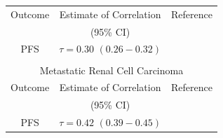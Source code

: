 \begin{table}[hb]
\begin{tabular}{|c|c|c|}
\hline
Outcome     & Estimate of Correlation    & Reference \\ 
            &  (95\% CI)    &           \\
\hline
PFS  & $\tau = 0.30$ $(0.26 - 0.32)$  & \cite{Halabi2009}   \\    
\hline
\multicolumn{3}{c}{ } \\
\multicolumn{3}{c}{Metastatic Renal Cell Carcinoma}   \\
\hline
Outcome     & Estimate of Correlation    & Reference \\ 
            &  (95\% CI)    &           \\
\hline
PFS  & $\tau = 0.42$  $(0.39 - 0.45)$  & \cite{Heng2010}   \\    
\hline
\end{tabular} 
\label{T:chap_intro:corr}
\end{table}




